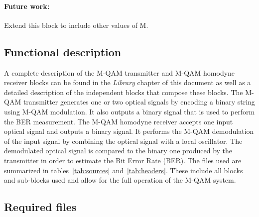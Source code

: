 \paragraph{Future work:} Extend this block to include other values of M.

\subsection*{Functional description}

A complete description of the M-QAM transmitter and M-QAM homodyne receiver blocks can be found in the \textit{Library} chapter of this document as well as a detailed description of the independent blocks that compose these blocks.
The M-QAM transmitter generates one or two optical signals by encoding a binary string using M-QAM modulation. It also outputs a binary signal that is used to perform the BER measurement.
The M-QAM homodyne receiver accepts one input optical signal and outputs
a binary signal. It performs the M-QAM demodulation of the input signal by combining the optical signal with a local oscillator.
The demodulated optical signal is compared to the binary one produced by the transmitter in order to estimate the Bit Error Rate (BER).
The files used are summarized in tables~\ref{tab:sources} and~\ref{tab:headers}. These include all blocks and sub-blocks used and allow for the full operation of the M-QAM system.

\subsection*{Required files}\label{RequiredFilesMQAM}

